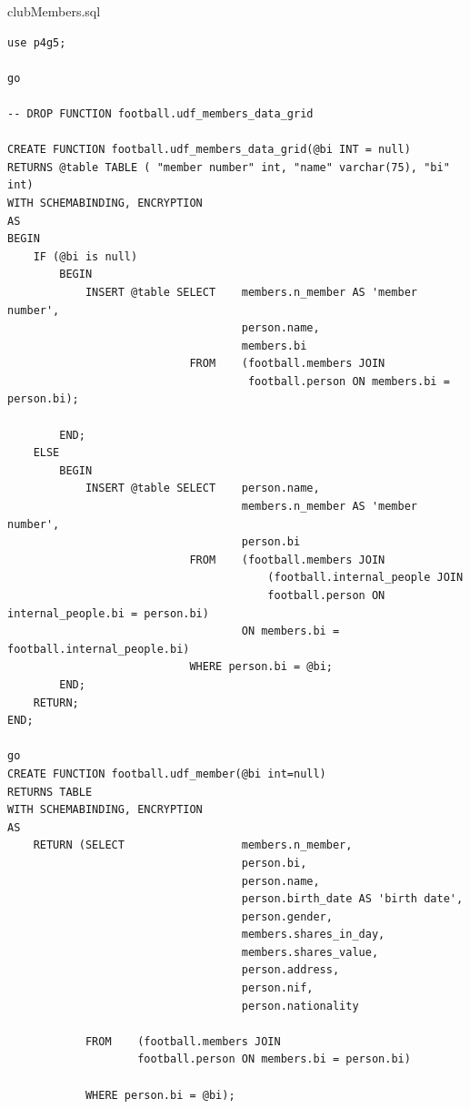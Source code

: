 \documentclass[pdftex,12pt,a4paper]{report}
\begin{document}
clubMembers.sql
\begin{lstlisting} 
use p4g5;

go

-- DROP FUNCTION football.udf_members_data_grid

CREATE FUNCTION football.udf_members_data_grid(@bi INT = null)
RETURNS @table TABLE ( "member number" int, "name" varchar(75), "bi" int)
WITH SCHEMABINDING, ENCRYPTION
AS
BEGIN
	IF (@bi is null)
		BEGIN
			INSERT @table SELECT	members.n_member AS 'member number',
									person.name,
									members.bi
							FROM	(football.members JOIN 
									 football.person ON members.bi = person.bi);
									
		END;
	ELSE
		BEGIN
			INSERT @table SELECT	person.name,
									members.n_member AS 'member number',
									person.bi
							FROM	(football.members JOIN 
										(football.internal_people JOIN
										football.person ON internal_people.bi = person.bi)
									ON members.bi = football.internal_people.bi)
							WHERE person.bi = @bi;
		END;
	RETURN;
END;

go
CREATE FUNCTION football.udf_member(@bi int=null) 
RETURNS TABLE
WITH SCHEMABINDING, ENCRYPTION
AS
	RETURN (SELECT					members.n_member,
									person.bi,
									person.name, 
									person.birth_date AS 'birth date',
									person.gender,
									members.shares_in_day,
									members.shares_value,
									person.address,
									person.nif,
									person.nationality
								
			FROM	(football.members JOIN 
					football.person ON members.bi = person.bi)
					
			WHERE person.bi = @bi);

\end{lstlisting}
\end{document}
